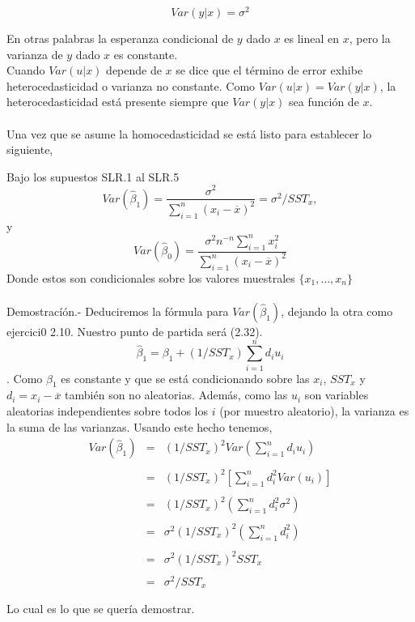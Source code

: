 \begin{equation}
    Var(y|x) = \sigma^2
\end{equation}

En otras palabras la esperanza condicional de $y$ dado $x$ es lineal en $x$, pero la varianza de $y$ dado $x$ es constante. \\
Cuando $Var(u|x) $ depende de $x$ se dice que el término de error exhibe heterocedasticidad o varianza no constante. Como $Var(u|x) = Var(y|x)$, la heterocedasticidad está presente siempre que $Var(y|x)$ sea función de $x$.\\\\
Una vez que se asume la homocedasticidad se está listo para establecer lo siguiente,\\

\begin{teo}
    Bajo los supuestos SLR.1 al SLR.5
    \begin{equation}
	Var(\hat{\beta}_1) = \dfrac{\sigma^2}{\sum\limits_{i=1}^n (x_i-\overline{x})^2} = \sigma^2 / SST_x,
    \end{equation}
    y
    \begin{equation}
	Var(\hat{\beta}_0) = \dfrac{\sigma^2 n^{-n} \sum\limits_{i=1}^n x_i^2}{\sum\limits_{i=1}^n (x_i-\overline{x})^2}
    \end{equation}
    Donde estos son condicionales sobre los valores muestrales $\lbrace x_1,\ldots , x_n\rbrace$\\\\
    Demostracíón.-\; Deduciremos la fórmula para $Var(\hat{\beta}_1)$, dejando la otra como ejercici0 2.10. Nuestro punto de partida será (2.32).
    $$\hat{\beta}_1 = \beta_1 + (1/SST_x) \sum\limits_{i=1}^n d_i u_i$$. Como $\beta_1$ es constante y que se está condicionando sobre las $x_i$, $SST_x$ y $d_i = x_i-\overline{x}$ también son no aleatorias. Además, como las $u_i$ son variables aleatorias independientes sobre todos los $i$ (por muestro aleatorio), la varianza es la suma de las varianzas. Usando este hecho tenemos,
    $$\begin{array}{rcl}
	Var(\hat{\beta}_1)&=&(1/SST_x)^2 Var\left(\sum\limits_{i=1}^n d_iu_i\right)  \\\\
			  &=&(1/SST_x)^2 \left[\sum\limits_{i=1}^n d_i^2 Var(u_i)\right]\\\\
			  &=&(1/SST_x)^2 \left(\sum\limits_{i=1}^n d_i^2 \sigma^2\right) \\\\
			  &=&\sigma^2 (1/SST_x)^2\left(\sum\limits_{i=1}^nd_i^2\right)\\\\
			  &=&\sigma^2 (1/SST_x)^2 SST_x\\\\
			  &=&\sigma^2/SST_x\\\\
    \end{array}$$
    Lo cual es lo que se quería demostrar.
\end{teo}

